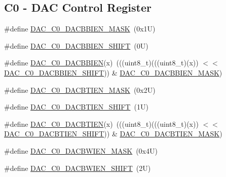 \subsection*{C0 -\/ D\+AC Control Register}
\begin{DoxyCompactItemize}
\item 
\#define \mbox{\hyperlink{group___d_a_c___register___masks_gadc37ad99d42f4b9d0e26ce03f2ac79ad}{D\+A\+C\+\_\+\+C0\+\_\+\+D\+A\+C\+B\+B\+I\+E\+N\+\_\+\+M\+A\+SK}}~(0x1\+U)
\item 
\#define \mbox{\hyperlink{group___d_a_c___register___masks_ga956aa991114a1bb71a891e66d7092d1e}{D\+A\+C\+\_\+\+C0\+\_\+\+D\+A\+C\+B\+B\+I\+E\+N\+\_\+\+S\+H\+I\+FT}}~(0\+U)
\item 
\#define \mbox{\hyperlink{group___d_a_c___register___masks_ga897a82572de7b549bb53f9544086ea6b}{D\+A\+C\+\_\+\+C0\+\_\+\+D\+A\+C\+B\+B\+I\+EN}}(x)~(((uint8\+\_\+t)(((uint8\+\_\+t)(x)) $<$$<$ \mbox{\hyperlink{group___d_a_c___register___masks_ga956aa991114a1bb71a891e66d7092d1e}{D\+A\+C\+\_\+\+C0\+\_\+\+D\+A\+C\+B\+B\+I\+E\+N\+\_\+\+S\+H\+I\+FT}})) \& \mbox{\hyperlink{group___d_a_c___register___masks_gadc37ad99d42f4b9d0e26ce03f2ac79ad}{D\+A\+C\+\_\+\+C0\+\_\+\+D\+A\+C\+B\+B\+I\+E\+N\+\_\+\+M\+A\+SK}})
\item 
\#define \mbox{\hyperlink{group___d_a_c___register___masks_gad8a60a2fa6211ff08bba4b9648fb8daa}{D\+A\+C\+\_\+\+C0\+\_\+\+D\+A\+C\+B\+T\+I\+E\+N\+\_\+\+M\+A\+SK}}~(0x2\+U)
\item 
\#define \mbox{\hyperlink{group___d_a_c___register___masks_ga1f8eb9a96341365badba1280bed49e05}{D\+A\+C\+\_\+\+C0\+\_\+\+D\+A\+C\+B\+T\+I\+E\+N\+\_\+\+S\+H\+I\+FT}}~(1\+U)
\item 
\#define \mbox{\hyperlink{group___d_a_c___register___masks_gabc7d24355da2dbae3e80fe7bb3119e72}{D\+A\+C\+\_\+\+C0\+\_\+\+D\+A\+C\+B\+T\+I\+EN}}(x)~(((uint8\+\_\+t)(((uint8\+\_\+t)(x)) $<$$<$ \mbox{\hyperlink{group___d_a_c___register___masks_ga1f8eb9a96341365badba1280bed49e05}{D\+A\+C\+\_\+\+C0\+\_\+\+D\+A\+C\+B\+T\+I\+E\+N\+\_\+\+S\+H\+I\+FT}})) \& \mbox{\hyperlink{group___d_a_c___register___masks_gad8a60a2fa6211ff08bba4b9648fb8daa}{D\+A\+C\+\_\+\+C0\+\_\+\+D\+A\+C\+B\+T\+I\+E\+N\+\_\+\+M\+A\+SK}})
\item 
\#define \mbox{\hyperlink{group___d_a_c___register___masks_gaedff72359a12b93e4b61a57a0613d3cb}{D\+A\+C\+\_\+\+C0\+\_\+\+D\+A\+C\+B\+W\+I\+E\+N\+\_\+\+M\+A\+SK}}~(0x4\+U)
\item 
\#define \mbox{\hyperlink{group___d_a_c___register___masks_ga2b61f6fc85e9dc9d7c736055b47fadd1}{D\+A\+C\+\_\+\+C0\+\_\+\+D\+A\+C\+B\+W\+I\+E\+N\+\_\+\+S\+H\+I\+FT}}~(2\+U)

\end{DoxyCompactItemize}
